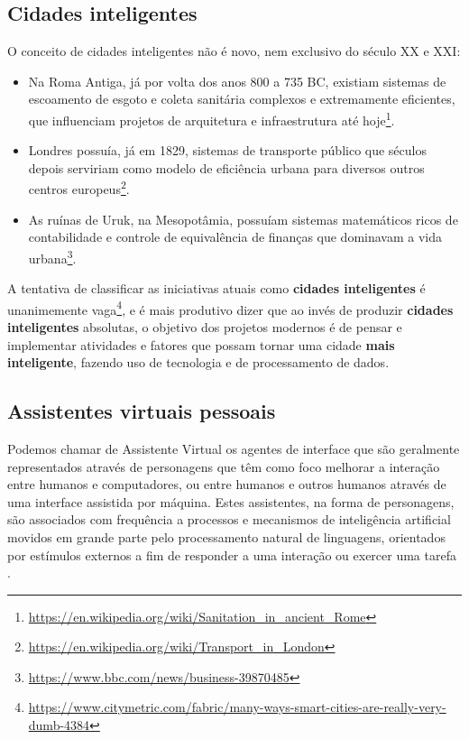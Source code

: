 \subsection{Cidades inteligentes} \label{ss:cidades_inteligentes}

O conceito de cidades inteligentes não é novo, nem exclusivo do século XX e XXI:

\begin{itemize}
    \item Na Roma Antiga, já por volta dos anos 800 a 735 BC, existiam sistemas de escoamento de esgoto e coleta sanitária complexos e extremamente eficientes, que influenciam projetos de arquitetura e infraestrutura até hoje\footnote{\url{https://en.wikipedia.org/wiki/Sanitation_in_ancient_Rome}}.
    
    \item Londres possuía, já em 1829, sistemas de transporte público que séculos depois serviriam como modelo de eficiência urbana para diversos outros centros europeus\footnote{\url{https://en.wikipedia.org/wiki/Transport_in_London}}.
    
    \item As ruínas de Uruk, na Mesopotâmia, possuíam sistemas matemáticos ricos de contabilidade e controle de equivalência de finanças que dominavam a vida urbana\footnote{\url{https://www.bbc.com/news/business-39870485}}.
\end{itemize}

A tentativa de classificar as iniciativas atuais como \textbf{cidades inteligentes} é unanimemente vaga\footnote{\url{https://www.citymetric.com/fabric/many-ways-smart-cities-are-really-very-dumb-4384}}, e é mais produtivo dizer que ao invés de produzir \textbf{cidades inteligentes} absolutas, o objetivo dos projetos modernos é de pensar e implementar atividades e fatores que possam tornar uma cidade \textbf{mais inteligente}, fazendo uso de tecnologia e de processamento de dados.

\subsection{Assistentes virtuais pessoais} \label{ss:assistentes_virtuais_pessoais}

Podemos chamar de Assistente Virtual os agentes de interface que são geralmente representados através de personagens que têm como foco melhorar a interação entre humanos e computadores, ou entre humanos e outros humanos através de uma interface assistida por máquina. Estes assistentes, na forma de personagens, são associados com frequência a processos e mecanismos de inteligência artificial movidos em grande parte pelo processamento natural de linguagens, orientados por estímulos externos a fim de responder a uma interação ou exercer uma tarefa \cite{reategui2006agentes}.

